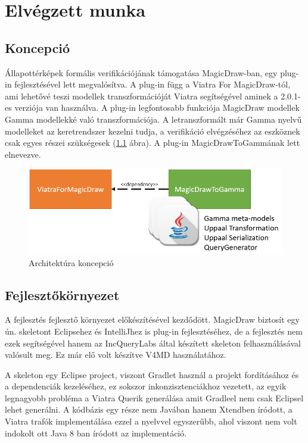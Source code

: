 \chapter{Elvégzett munka}


\section{Koncepció}
Állapottérképek formális verifikációjának támogatása MagicDraw-ban, egy plug-in fejlesztésével lett megvalósítva. A plug-in függ a Viatra For MagicDraw-tól, ami lehetővé teszi modellek transzformációját Viatra segítségével aminek a 2.0.1-es verziója van használva. A plug-in legfontosabb funkciója MagicDraw modellek Gamma modellekké való transzformációja. A letranszformált már Gamma nyelvű modelleket az keretrendszer kezelni tudja, a verifikáció elvégzéséhez az eszköznek csak egyes részei szükségesek (\ref{fig:used-gamma} ábra). A plug-in MagicDrawToGammának lett elnevezve.

\begin{figure}[!ht]
	\centering
	\includegraphics[keepaspectratio, width=120mm]{figures/plan.png}
	\caption{Architektúra koncepció}
	\label{fig:used-gamma}
\end{figure}

\section{Fejlesztőkörnyezet}
 A fejlesztés fejlesztő környezet előkészítésével kezdődött. MagicDraw biztosít egy ún. skeletont Eclipsehez és IntelliJhez is plug-in fejlesztéséhez, de a fejlesztés nem ezek segítségével hanem az IncQueryLabs által készített skeleton felhasználásával valósult meg. Ez már elő volt készítve V4MD használatához.
 
A skeleton egy Eclipse project, viszont Gradlet használ a projekt fordításához és a dependenciák kezeléséhez, ez sokszor inkonzisztenciákhoz vezetett, az egyik legnagyobb probléma a Viatra Querik generálása amit Gradleel nem csak Eclipsel lehet generálni. A kódbázis egy része nem Javában hanem Xtendben íródott, a Viatra trafók implementálása ezzel a nyelvvel egyszerűbb, ahol viszont nem volt indokolt ott Java 8 ban íródott az implementáció.

